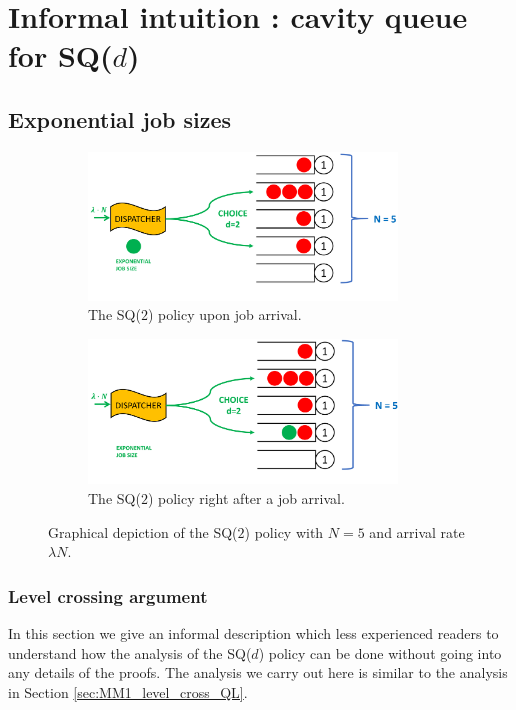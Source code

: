 \documentclass[12pt]{report}
\begin{document}
\section{Informal intuition : cavity queue for SQ($d$)}\label{sec:intuition_SQd}
\subsection{Exponential job sizes}
\begin{figure}[t]
	\begin{subfigure}{.45\textwidth}
		\centering
		\includegraphics[width=0.9\textwidth]{figures/Chapter1/SQd.PNG}
		\caption{The SQ($2$) policy upon job arrival.}
		\label{fig:SQ2_pre}
	\end{subfigure}
	\begin{subfigure}{.45\textwidth}
		\centering
		\includegraphics[width=0.9\textwidth]{figures/Chapter1/SQd2.PNG}
		\caption{The SQ($2$) policy right after a job arrival.}
		\label{fig:SQ2_post}
	\end{subfigure}
	\caption{Graphical depiction of the SQ($2$) policy with $N=5$ and arrival rate $\lambda N$.}\label{fig:SQ2}
\end{figure}
\subsubsection{Level crossing argument}
In this section we give an informal description which less experienced readers to understand how the analysis of the SQ($d$) policy can be done without going into any details of the proofs. The analysis we carry out here is similar to the analysis in Section \ref{sec:MM1_level_cross_QL}.
\end{document}
